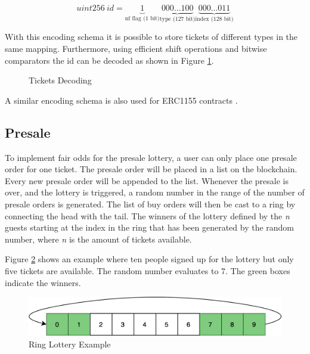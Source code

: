 \[
    uint256\ id = 
    \underbrace{1}_\text{nf flag (1 bit)}
    \underbrace{000...100}_\text{type (127 bit)}
    \underbrace{000...011}_\text{index (128 bit)}
 \]
 
With this encoding schema it is possible to store tickets of different types in the same mapping. Furthermore, using efficient shift operations and bitwise comparators the id can be decoded as shown in Figure \ref{code:tickets-decoding}.

\begin{figure}[H]
    
    \caption{Tickets Decoding}
    \label{code:tickets-decoding}
\end{figure}

A similar encoding schema is also used for ERC1155 contracts \cite{erc1155}.

\subsection{Presale}\label{section:imp:presale}

To implement fair odds for the presale lottery, a user can only place one presale order for one ticket. The presale order will be placed in a list on the blockchain. Every new presale order will be appended to the list. Whenever the presale is over, and the lottery is triggered, a random number in the range of the number of presale orders is generated. The list of buy orders will then be cast to a ring by connecting the head with the tail. The winners of the lottery defined by the \textit{n} guests starting at the index in the ring that has been generated by the random number, where \textit{n} is the amount of tickets available. 

Figure \ref{fig:ring-lottery} shows an example where ten people signed up for the lottery but only five tickets are available. The random number evaluates to 7. The green boxes indicate the winners.

\begin{figure}[H]
    \centering
    \includegraphics[width=14cm]{images/lottery.png}
    \caption{Ring Lottery Example}
    \label{fig:ring-lottery}
\end{figure}

